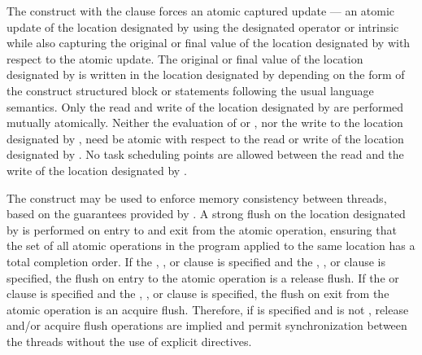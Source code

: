 The  construct with the  clause forces an
atomic captured update --- an atomic update of the
location designated by  using the designated operator or intrinsic
while also capturing the original or final value of the location designated by
 with respect to the atomic update. The original or final value of the
location designated by  is written in the location designated by
 depending on the form of the  construct structured block
or statements following the usual language semantics. Only the read and write
of the location designated by  are performed mutually atomically.
Neither the evaluation of  or , nor the write to the
location designated by , need be atomic with respect to the read or
write of the location designated by . No task scheduling points are
allowed between the read and the write of the location designated by .

The  construct may be used to enforce memory consistency between
threads, based on the guarantees provided by .  A strong flush on the location designated by 
is performed on entry to and exit from the atomic operation, ensuring that the
set of all atomic operations in the program applied to the same location has a
total completion order.  If the , , or 
clause is specified and the , , or
 clause is specified, the flush on entry to the atomic operation is a
release flush.  If the  or  clause
is specified and the , , or 
clause is specified, the flush on exit from the atomic operation is an acquire flush.
Therefore, if  is specified and is not
, release and/or acquire flush operations are implied and permit
synchronization between the threads without the use of explicit 
directives.


